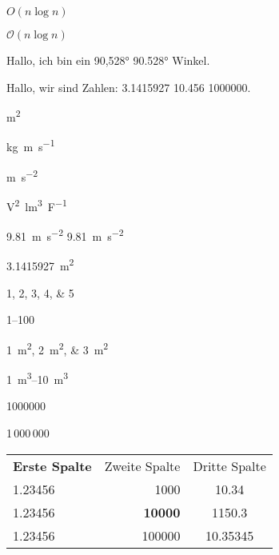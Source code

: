 \documentclass[20pt,ngerman]{scrartcl}
\begin{document}
$O(n\log{}n)$ %
 
$\mathcal{O}(n\log{}n)$ %



Hallo, ich bin ein \ang{90,528} \ang{90.528} Winkel.

Hallo, wir sind Zahlen: \num{3,1415927} \num{10,456} \num{1000000}.

\si{m^2}

\si{kg.m.s^{-1}}

\si{\metre \per  \second^2}

\si{\square\volt\cubic\lumen\per\farad}


\SI{9,81}{m.s^{-2}} \SI{9,81}{m\per \second^2}

\SI{3,1415927}{m^2}


\numlist{1;2;3;4;5}

\numrange{1}{100}

\SIlist{1;2;3}{m^2}

\SIrange{1}{10}{m^3}

\num{1000000}

1\,000\,000

\vspace*{1cm}
\begin{tabular}{lrS}
\textbf{Erste Spalte} & {\large Zweite Spalte} & {Dritte Spalte} \\
1.23456 & 1000     & 10.34 \\
1.23456 & \textbf{10000} & 1150.3 \\ 
1.23456 & 100000 & 10.35345 \\
\end{tabular}

\end{document}

